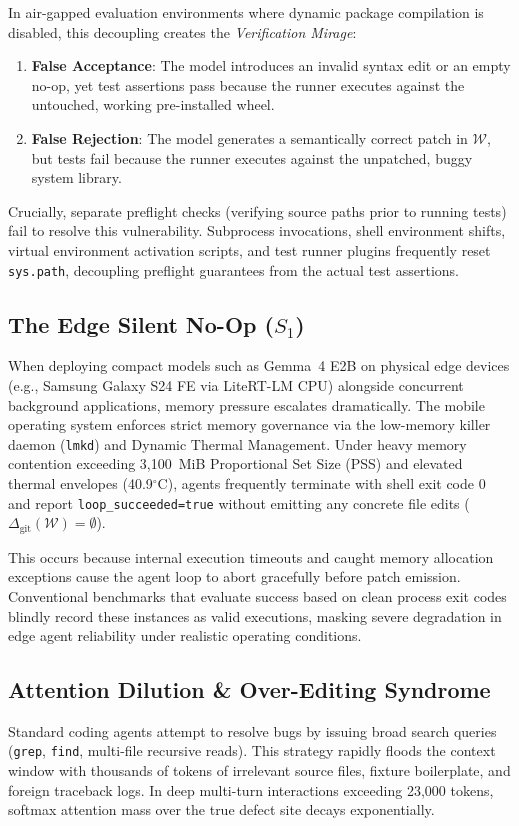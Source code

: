 \documentclass[10pt,twocolumn]{article}
\begin{document}
In air-gapped evaluation environments where dynamic package compilation is disabled, this decoupling creates the \textit{Verification Mirage}:
\begin{enumerate}
    \item \textbf{False Acceptance}: The model introduces an invalid syntax edit or an empty no-op, yet test assertions pass because the runner executes against the untouched, working pre-installed wheel.
    \item \textbf{False Rejection}: The model generates a semantically correct patch in $\mathcal{W}$, but tests fail because the runner executes against the unpatched, buggy system library.
\end{enumerate}
Crucially, separate preflight checks (verifying source paths prior to running tests) fail to resolve this vulnerability. Subprocess invocations, shell environment shifts, virtual environment activation scripts, and test runner plugins frequently reset \texttt{sys.path}, decoupling preflight guarantees from the actual test assertions.

\subsection{The Edge Silent No-Op \texorpdfstring{($S_1$)}{(S1)}}
When deploying compact models such as Gemma~4 E2B on physical edge devices (e.g., Samsung Galaxy S24 FE via LiteRT-LM CPU) alongside concurrent background applications, memory pressure escalates dramatically. The mobile operating system enforces strict memory governance via the low-memory killer daemon (\texttt{lmkd}) and Dynamic Thermal Management. Under heavy memory contention exceeding 3,100~MiB Proportional Set Size (PSS) and elevated thermal envelopes (40.9$^\circ$C), agents frequently terminate with shell exit code 0 and report \texttt{loop\_succeeded=true} without emitting any concrete file edits ($\Delta_{\text{git}}(\mathcal{W}) = \emptyset$).

This occurs because internal execution timeouts and caught memory allocation exceptions cause the agent loop to abort gracefully before patch emission. Conventional benchmarks that evaluate success based on clean process exit codes blindly record these instances as valid executions, masking severe degradation in edge agent reliability under realistic operating conditions.

\subsection{Attention Dilution \& Over-Editing Syndrome}
Standard coding agents attempt to resolve bugs by issuing broad search queries (\texttt{grep}, \texttt{find}, multi-file recursive reads). This strategy rapidly floods the context window with thousands of tokens of irrelevant source files, fixture boilerplate, and foreign traceback logs. In deep multi-turn interactions exceeding 23,000 tokens, softmax attention mass over the true defect site decays exponentially.
\end{document}
